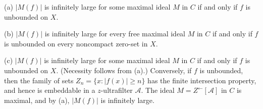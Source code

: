 (a) $|M(f)|$ is infinitely large for some maximal ideal $M$ in $C$ if and only if $f$ is unbounded on $X$.

(b) $|M(f)|$ is infinitely large for every free maximal ideal $M$ in $C$ if and only if $f$ is unbounded on every noncompact zero-set in $X$.

(c) $|M(f)|$ is infinitely large for some maximal ideal $M$ in $C$ if and only if $f$ is unbounded on $X$. (Necessity follows from (a).) Conversely, if $f$ is unbounded, then the family of sets $Z_n = \{x : |f(x)| \geq n\}$ has the finite intersection property, and hence is embeddable in a $z$-ultrafilter $\mathcal{A}$. The ideal $M = Z^{\leftarrow}[\mathcal{A}]$ in $C$ is maximal, and by (a), $|M(f)|$ is infinitely large.

